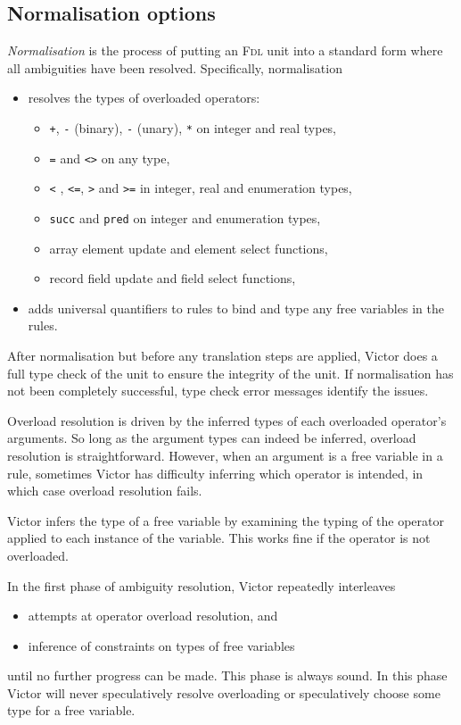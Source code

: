 \documentclass[12pt,fleqn]{article}
\newcommand{\fdl}{\textsc{Fdl}}
\begin{document}
\subsection{Normalisation options}
\emph{Normalisation} is the process of putting an \fdl{} unit into a
standard form where all ambiguities have been resolved.
Specifically, normalisation
\begin{itemize}
\item resolves the types of overloaded operators:
  \begin{itemize}
  \item \verb_+_, \verb_-_ (binary), \verb_-_ (unary), \verb_*_ on
    integer and real types,
  \item \verb_=_ and \verb_<>_ on any type,
  \item \verb_<_ , \verb_<=_, \verb_>_ and \verb_>=_ in integer, real and enumeration types,
  \item \verb_succ_ and \verb_pred_ on integer and enumeration types,
  \item array element update and element select functions, 
  \item record field update and field select functions,
  \end{itemize}

\item adds universal quantifiers to rules to bind and type any free
  variables in the rules.
\end{itemize}

After normalisation but before any translation steps are applied,
Victor does a full type check of the unit to ensure the integrity of
the unit.  If normalisation has not been completely successful, type
check error messages identify the issues.

Overload resolution is driven by the inferred types of each overloaded
operator's arguments.  So long as the argument types can indeed be
inferred, overload resolution is straightforward.  However, when an
argument is a free variable in a rule, sometimes Victor has difficulty
inferring which operator is intended, in which case overload
resolution fails.

Victor infers the type of a free variable by examining the typing of
the operator applied to each instance of the variable.  This works
fine if the operator is not overloaded. 

In the first phase of ambiguity resolution, Victor repeatedly
interleaves 
\begin{itemize}
\item attempts at operator overload resolution, and
\item inference of constraints on types of free variables 
\end{itemize}
until no further progress can
be made.  This phase is always sound.  In this phase Victor will never
speculatively resolve overloading or speculatively choose some type
for a free variable.
\end{document}
